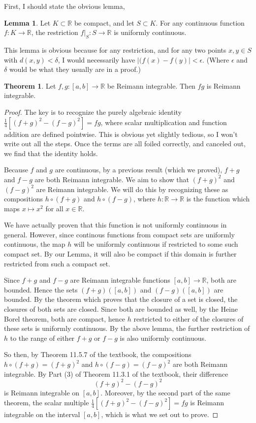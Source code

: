 \documentclass[12pt]{article}
\newcommand{\R}{\mathbb{R}}
\theoremstyle{definition}
\newtheorem{theorem}{Theorem}
\newtheorem{lemma}{Lemma}
\begin{document}
First, I should state the obvious lemma,

\begin{lemma}
    Let $K\subset \R$ be compact, and let $S\subset K$. For any continuous function $f:K\to \R$, the restriction $f|_S:S\to \R$ is uniformly continuous.
\end{lemma}

This lemma is obvious because for any restriction, and for any two points $x, y\in S$ with $d(x,y) < \delta$, I would necessarily have $|(f(x)- f(y)| < \epsilon$. (Where $\epsilon$ and $\delta$ would be what they usually are in a proof.)

\begin{theorem}
    Let $f,g:[a,b]\to \R$ be Reimann integrable. Then $fg$ is Reimann integrable. 
\end{theorem}

\begin{proof}
    The key is to recognize the purely algebraic identity $ \frac{1}{4}[(f + g)^2 - (f - g)^2] = fg $, where scalar multiplication and function addition are defined pointwise. This is obvious yet slightly tedious, so I won't write out all the steps. Once the terms are all foiled correctly, and canceled out, we find that the identity holds. 

    Because $f $ and $g$ are continuous, by a previous result (which we proved), $f + g$ and $f - g$ are both Reimann integrable. We aim to show that $ (f + g)^2 $ and $ (f - g)^2 $ are Reimann integrable. We will do this by recognizing these as compositions $h\circ (f+g)$ and $h\circ (f - g)$, where $h:\R\to \R$ is the function which maps $x\mapsto x^2$ for all $x\in \R$. 

    We have actually proven that this function is not uniformly continuous in general. However, since continous functions from compact sets are uniformly continuous, the map $h$ will be uniformly continuous if restricted to some such compact set. By our Lemma, it will also be compact if this domain is further restricted from such a compact set. 

    Since $f + g$ and $f - g$ are Reimann integrable functions $[a,b]\to \R$, both are bounded. Hence the sets $ (f + g)([a,b])$ and $ (f - g)([a,b]) $ are bounded. By the theorem which proves that the closure of a set is closed, the closures of both sets are closed. Since both are bounded as well, by the Heine Borel theorem, both are compact, hence $h$ restricted to either of the closures of these sets is uniformly continuous. By the above lemma, the further restriction of $h$ to the range of either $f + g$ or $f - g$ is also uniformly continuous. 

    So then, by Theorem 11.5.7 of the textbook, the compositions $h\circ (f + g) = (f + g)^2$ and $ h\circ (f -g) = (f - g)^2$ are both Reimann integrable. By Part (3) of Theorem 11.3.1 of the textbook, their difference 
    \[
        (f + g)^2 - (f - g)^2
        \]
    is Reimann integrable on $[a,b]$. 
    Moreover, by the second part of the same theorem, the scalar multiple $\frac{1}{4}[(f + g)^2 - (f - g)^2] = fg$ is Reimann integrable on the interval $[a,b]$, which is what we set out to prove.
\end{proof}
\end{document}
